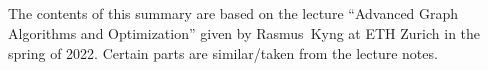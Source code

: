 
\begin{fullwidth}

\section*{}
The contents of this summary are based on the lecture ``Advanced Graph Algorithms and Optimization'' given by \mbox{Rasmus Kyng} at ETH Zurich in the spring of 2022. Certain parts are similar/taken from the lecture notes.

\end{fullwidth}
\thispagestyle{empty}
\clearpage
